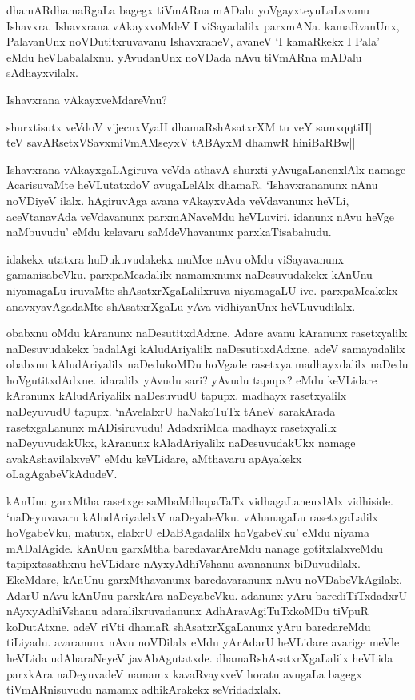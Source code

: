 dhamARdhamaRgaLa bagegx tiVmARna mADalu yoVgayxteyuLaLxvanu Ishavxra. Ishavxrana vAkayxvoMdeV I viSayadalilx parxmANa. kamaRvanUnx, PalavanUnx noVDutitxruvavanu IshavxraneV, avaneV `I kamaRkekx I Pala' eMdu heVLabalalxnu. yAvudanUnx noVDada nAvu tiVmARna mADalu sAdhayxvilalx.

Ishavxrana vAkayxveMdareVnu?

\begin{shloka}
shurxtisutx veVdoV vijecnxVyaH dhamaRshAsatxrXM tu veY samxqqtiH|\\
teV savARsetxVSavxmiVmAMseyxV tABAyxM dhamwR hiniBaRBw||
\end{shloka}

Ishavxrana vAkayxgaLAgiruva veVda athavA shurxti yAvugaLanenxlAlx namage AcarisuvaMte heVLutatxdoV avugaLelAlx dhamaR. `Ishavxrananunx nAnu noVDiyeV ilalx. hAgiruvAga avana vAkayxvAda veVdavanunx heVLi, aceVtanavAda veVdavanunx parxmANaveMdu heVLuviri. idanunx nAvu heVge naMbuvudu' eMdu kelavaru saMdeVhavanunx parxkaTisabahudu.

idakekx utatxra huDukuvudakekx muMce nAvu oMdu viSayavanunx gamanisabeVku. parxpaMcadalilx namamxnunx naDesuvudakekx kAnUnu-niyamagaLu iruvaMte shAsatxrXgaLalilxruva niyamagaLU ive. parxpaMcakekx anavxyavAgadaMte shAsatxrXgaLu yAva vidhiyanUnx heVLuvudilalx.

obabxnu oMdu kAranunx naDesutitxdAdxne. Adare avanu kAranunx rasetxyalilx naDesuvudakekx badalAgi kAludAriyalilx naDesutitxdAdxne. adeV samayadalilx obabxnu kAludAriyalilx naDedukoMDu hoVgade rasetxya madhayxdalilx naDedu hoVgutitxdAdxne. idaralilx yAvudu sari? yAvudu tapupx? eMdu keVLidare kAranunx kAludAriyalilx naDesuvudU tapupx. madhayx rasetxyalilx naDeyuvudU tapupx. `nAvelalxrU haNakoTuTx tAneV sarakArada rasetxgaLanunx mADisiruvudu! AdadxriMda madhayx rasetxyalilx naDeyuvudakUkx, kAranunx kAladAriyalilx naDesuvudakUkx namage avakAshavilalxveV' eMdu keVLidare, aMthavaru apAyakekx oLagAgabeVkAdudeV.

kAnUnu garxMtha rasetxge saMbaMdhapaTaTx vidhagaLanenxlAlx vidhiside. `naDeyuvavaru kAludAriyalelxV naDeyabeVku. vAhanagaLu rasetxgaLalilx hoVgabeVku, matutx, elalxrU eDaBAgadalilx hoVgabeVku' eMdu niyama mADalAgide. kAnUnu garxMtha baredavarAreMdu nanage gotitxlalxveMdu tapipxtasathxnu heVLidare nAyxyAdhiVshanu avananunx biDuvudilalx. EkeMdare, kAnUnu garxMthavanunx baredavaranunx nAvu noVDabeVkAgilalx. AdarU nAvu kAnUnu parxkAra naDeyabeVku. adanunx yAru barediTiTxdadxrU nAyxyAdhiVshanu adaralilxruvadanunx AdhAravAgiTuTxkoMDu tiVpuR koDutAtxne. adeV riVti dhamaR shAsatxrXgaLanunx yAru baredareMdu tiLiyadu. avaranunx nAvu noVDilalx eMdu yArAdarU heVLidare avarige meVle heVLida udAharaNeyeV javAbAgutatxde. dhamaRshAsatxrXgaLalilx heVLida parxkAra naDeyuvadeV namamx kavaRvayxveV horatu avugaLa bagegx tiVmARnisuvudu namamx adhikArakekx seVridadxlalx.

